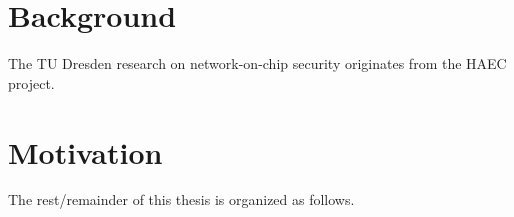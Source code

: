 \section{Background}\label{sec:background}
The TU Dresden research on network-on-chip security originates from the HAEC project.

\section{Motivation}\label{sec:motivation}

The rest/remainder of this thesis is organized as follows.
